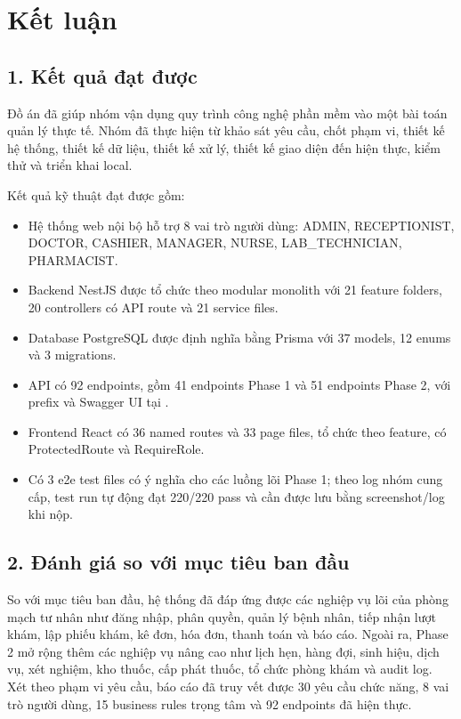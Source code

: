\chapter*{Kết luận}

\section*{1. Kết quả đạt được}

Đồ án \textbf{\projecttitle} đã giúp nhóm vận dụng quy trình công nghệ phần mềm vào một bài toán quản lý thực tế. Nhóm đã thực hiện từ khảo sát yêu cầu, chốt phạm vi, thiết kế hệ thống, thiết kế dữ liệu, thiết kế xử lý, thiết kế giao diện đến hiện thực, kiểm thử và triển khai local.

Kết quả kỹ thuật đạt được gồm:

\begin{itemize}
    \item Hệ thống web nội bộ hỗ trợ 8 vai trò người dùng: ADMIN, RECEPTIONIST, DOCTOR, CASHIER, MANAGER, NURSE, LAB\_TECHNICIAN, PHARMACIST.
    \item Backend NestJS được tổ chức theo modular monolith với 21 feature folders, 20 controllers có API route và 21 service files.
    \item Database PostgreSQL được định nghĩa bằng Prisma với 37 models, 12 enums và 3 migrations.
    \item API có 92 endpoints, gồm 41 endpoints Phase 1 và 51 endpoints Phase 2, với prefix  và Swagger UI tại .
    \item Frontend React có 36 named routes và 33 page files, tổ chức theo feature, có ProtectedRoute và RequireRole.
    \item Có 3 e2e test files có ý nghĩa cho các luồng lõi Phase 1; theo log nhóm cung cấp, test run tự động đạt 220/220 pass và cần được lưu bằng screenshot/log khi nộp.
\end{itemize}

\section*{2. Đánh giá so với mục tiêu ban đầu}

So với mục tiêu ban đầu, hệ thống đã đáp ứng được các nghiệp vụ lõi của phòng mạch tư nhân như đăng nhập, phân quyền, quản lý bệnh nhân, tiếp nhận lượt khám, lập phiếu khám, kê đơn, hóa đơn, thanh toán và báo cáo. Ngoài ra, Phase 2 mở rộng thêm các nghiệp vụ nâng cao như lịch hẹn, hàng đợi, sinh hiệu, dịch vụ, xét nghiệm, kho thuốc, cấp phát thuốc, tổ chức phòng khám và audit log. Xét theo phạm vi yêu cầu, báo cáo đã truy vết được 30 yêu cầu chức năng, 8 vai trò người dùng, 15 business rules trọng tâm và 92 endpoints đã hiện thực.

